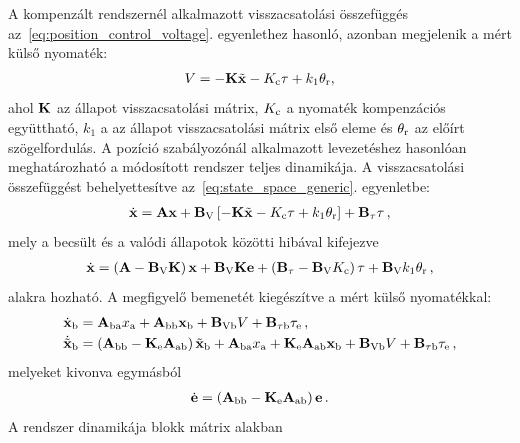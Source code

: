 A kompenzált rendszernél alkalmazott visszacsatolási összefüggés az~\eqref{eq:position_control_voltage}. egyenlethez
hasonló, azonban megjelenik a mért külső nyomaték:
\begin{align}
    V = -\mathbf{K} \tilde{\mathbf{x}} -K_{\mathrm{c}} \tau + k_1 \theta_{\mathrm{r}},
\end{align}
ahol $\mathbf{K}$ az állapot visszacsatolási mátrix, $K_{\mathrm{c}}$ a nyomaték kompenzációs együttható,
$k_1$ a az állapot visszacsatolási mátrix első eleme és $\theta_{\mathrm{r}}$ az előírt szögelfordulás.
A pozíció szabályozónál alkalmazott levezetéshez hasonlóan meghatározható a módosított rendszer teljes dinamikája.
A visszacsatolási összefüggést behelyettesítve az~\eqref{eq:state_space_generic}. egyenletbe:
\begin{align}\label{eq:state_control_law_subs}
    \dot{\mathbf{x}} = \mathbf{A} \mathbf{x} + \mathbf{B}_{\mathrm{V}}\left[-\mathbf{K} \tilde{\mathbf{x}} -K_{\mathrm{c}} \tau + k_1 \theta_{\mathrm{r}}\right] + \mathbf{B}_{\mathrm{\tau}} \tau\,,
\end{align}
mely a becsült és a valódi állapotok közötti hibával kifejezve 
\begin{align}
    \dot{\mathbf{x}} = \left(\mathbf{A} - \mathbf{B}_{\mathrm{V}} \mathbf{K}\right) \mathbf{x} + 
    \mathbf{B}_{\mathrm{V}} \mathbf{K} \mathbf{e} + 
    \left(\mathbf{B}_{\mathrm{\tau}} - \mathbf{B}_{\mathrm{V}} K_{\mathrm{c}}\right) \tau + 
    \mathbf{B}_{\mathrm{V}} k_1 \theta_{\mathrm{r}}\,,
\end{align}
alakra hozható. A megfigyelő bemenetét kiegészítve a mért külső nyomatékkal:
\begin{equation}
    \begin{split}
    \dot{\mathbf{x}}_{\mathrm{b}} &= \mathbf{A}_{\mathrm{ba}} x_{\mathrm{a}} + \mathbf{A}_{\mathrm{bb}} \mathbf{x}_{\mathrm{b}} + 
    \mathbf{B}_{\mathrm{Vb}} V + \mathbf{B}_{\mathrm{\tau b}} \tau_{\mathrm{e}}\,,\\
    \dot{\tilde{\mathbf{x}}}_{\mathrm{b}} &= \left(\mathbf{A}_{\mathrm{bb}} - \mathbf{K}_{\mathrm{e}} \mathbf{A}_{\mathrm{ab}}\right) \tilde{\mathbf{x}}_{\mathrm{b}} +
    \mathbf{A}_{\mathrm{ba}} x_{\mathrm{a}} +
    \mathbf{K}_{\mathrm{e}} \mathbf{A}_{\mathrm{ab}} \mathbf{x}_{\mathrm{b}} +
    \mathbf{B}_{\mathrm{Vb}} V + \mathbf{B}_{\mathrm{\tau b}} \tau_{\mathrm{e}}\,,
    \end{split}
\end{equation}
melyeket kivonva egymásból
\begin{align}
    \dot{\mathbf{e}} = \left(\mathbf{A}_{\mathrm{bb}} - \mathbf{K}_{\mathrm{e}} \mathbf{A}_{\mathrm{ab}}\right) \mathbf{e}\,.
\end{align}
A rendszer dinamikája blokk mátrix alakban
